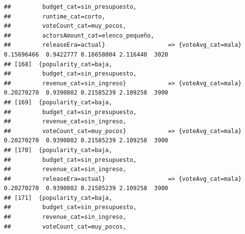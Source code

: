 \documentclass[
]{article}
\begin{document}
\begin{verbatim}
##         budget_cat=sin_presupuesto,                                                                                             
##         runtime_cat=corto,                                                                                                      
##         voteCount_cat=muy_pocos,                                                                                                
##         actorsAmount_cat=elenco_pequeño,                                                                                        
##         releaseEra=actual}                  => {voteAvg_cat=mala}                0.15696466  0.9422777 0.16658004 2.116440  3020
## [168]  {popularity_cat=baja,                                                                                                    
##         budget_cat=sin_presupuesto,                                                                                             
##         revenue_cat=sin_ingreso}            => {voteAvg_cat=mala}                0.20270270  0.9390802 0.21585239 2.109258  3900
## [169]  {popularity_cat=baja,                                                                                                    
##         budget_cat=sin_presupuesto,                                                                                             
##         revenue_cat=sin_ingreso,                                                                                                
##         voteCount_cat=muy_pocos}            => {voteAvg_cat=mala}                0.20270270  0.9390802 0.21585239 2.109258  3900
## [170]  {popularity_cat=baja,                                                                                                    
##         budget_cat=sin_presupuesto,                                                                                             
##         revenue_cat=sin_ingreso,                                                                                                
##         releaseEra=actual}                  => {voteAvg_cat=mala}                0.20270270  0.9390802 0.21585239 2.109258  3900
## [171]  {popularity_cat=baja,                                                                                                    
##         budget_cat=sin_presupuesto,                                                                                             
##         revenue_cat=sin_ingreso,                                                                                                
##         voteCount_cat=muy_pocos,                                                                                                

\end{verbatim}
\end{document}
